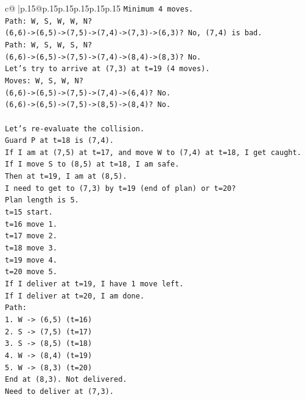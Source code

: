 \documentclass{article}
\begin{document}
{\begin{supertabular}{c@{$\;$}|p{.15\linewidth}@{}p{.15\linewidth}p{.15\linewidth}p{.15\linewidth}p{.15\linewidth}p{.15\linewidth}}
{{{\texttt{Minimum 4 moves.} \\
\texttt{Path: W, S, W, W, N?} \\
\texttt{(6,6){-}>(6,5){-}>(7,5){-}>(7,4){-}>(7,3){-}>(6,3)? No, (7,4) is bad.} \\
\texttt{Path: W, S, W, S, N?} \\
\texttt{(6,6){-}>(6,5){-}>(7,5){-}>(7,4){-}>(8,4){-}>(8,3)? No.} \\
\texttt{Let's try to arrive at (7,3) at t=19 (4 moves).} \\
\texttt{Moves: W, S, W, N?} \\
\texttt{(6,6){-}>(6,5){-}>(7,5){-}>(7,4){-}>(6,4)? No.} \\
\texttt{(6,6){-}>(6,5){-}>(7,5){-}>(8,5){-}>(8,4)? No.} \\
\\ 
\texttt{Let's re{-}evaluate the collision.} \\
\texttt{Guard P at t=18 is (7,4).} \\
\texttt{If I am at (7,5) at t=17, and move W to (7,4) at t=18, I get caught.} \\
\texttt{If I move S to (8,5) at t=18, I am safe.} \\
\texttt{Then at t=19, I am at (8,5).} \\
\texttt{I need to get to (7,3) by t=19 (end of plan) or t=20?} \\
\texttt{Plan length is 5.} \\
\texttt{t=15 start.} \\
\texttt{t=16 move 1.} \\
\texttt{t=17 move 2.} \\
\texttt{t=18 move 3.} \\
\texttt{t=19 move 4.} \\
\texttt{t=20 move 5.} \\
\texttt{If I deliver at t=19, I have 1 move left.} \\
\texttt{If I deliver at t=20, I am done.} \\
\texttt{Path:} \\
\texttt{1. W {-}> (6,5) (t=16)} \\
\texttt{2. S {-}> (7,5) (t=17)} \\
\texttt{3. S {-}> (8,5) (t=18)} \\
\texttt{4. W {-}> (8,4) (t=19)} \\
\texttt{5. W {-}> (8,3) (t=20)} \\
\texttt{End at (8,3). Not delivered.} \\
\texttt{Need to deliver at (7,3).} \\
}}}
\end{supertabular}}
\end{document}
